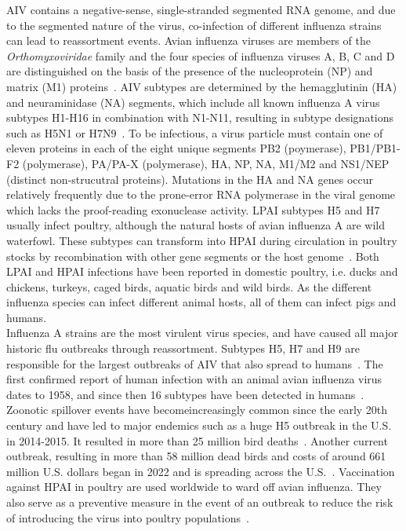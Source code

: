 AIV contains a negative-sense, single-stranded segmented RNA genome, and due to the segmented nature of the virus, co-infection of different influenza strains can lead to reassortment events. Avian influenza viruses are members of the \textit{Orthomyxoviridae} family and the four species of influenza viruses A, B, C and D are distinguished on the basis of the presence of the nucleoprotein (NP) and matrix (M1) proteins~\cite{webster1992evolution}. AIV subtypes are determined by the hemagglutinin (HA) and neuraminidase (NA) segments, which include all known influenza A virus subtypes H1-H16 in combination with N1-N11, resulting in subtype designations such as H5N1 or H7N9~\cite{webster1992evolution, krammer2018influenza}. To be infectious, a virus particle must contain one of eleven proteins in each of the eight unique segments PB2 (poymerase), PB1/PB1-F2 (polymerase), PA/PA-X (polymerase), HA, NP, NA, M1/M2 and NS1/NEP (distinct non-strucutral proteins). Mutations in the HA and NA genes occur relatively frequently due to the prone-error RNA polymerase in the viral genome which lacks the proof-reading exonuclease activity. LPAI subtypes H5 and H7 usually infect poultry, although the natural hosts of avian influenza A are wild waterfowl. These subtypes can transform into HPAI during circulation in poultry stocks by recombination with other gene segments or the host genome~\cite{webster2006h5n1}. Both LPAI and HPAI infections have been reported in domestic poultry, i.e. ducks and chickens, turkeys, caged birds, aquatic birds and wild birds. As the different influenza species can infect different animal hosts, all of them can infect pigs and humans. \\
Influenza A strains are the most virulent virus species, and have caused all major historic flu outbreaks through reassortment. Subtypes H5, H7 and H9 are responsible for the largest outbreaks of AIV that also spread to humans~\cite{widdowson2017global}. The first confirmed report of human infection with an animal avian influenza virus dates to 1958, and since then 16 subtypes have been detected in humans~\cite{kluska1961demonstration}. Zoonotic spillover events have becomeincreasingly common since the early 20th century and have led to major endemics such as a huge H5 outbreak in the U.S. in 2014-2015. It resulted in more than 25 million bird deaths~\cite{seeger2021poultry}. Another current outbreak, resulting in more than 58 million dead birds and costs of around 661 million U.S. dollars began in 2022 and is spreading across the U.S.~\cite{usda2023hpai}. 
Vaccination against HPAI in poultry are used worldwide to ward off avian influenza. They also serve as a preventive measure in the event of an outbreak to reduce the risk of introducing the virus into poultry populations~\cite{swayne2013current, swayne2011assessment}. 

